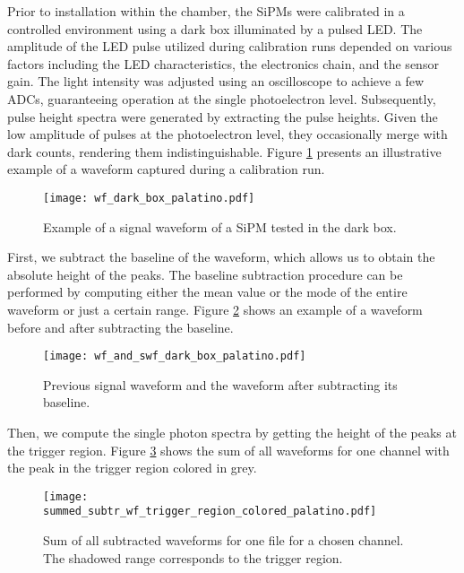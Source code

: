 \documentclass[11pt,a4paper,english,oneside, pdf]{article}
\begin{document}
	Prior to installation within the chamber, the SiPMs were calibrated in a controlled environment using a dark box illuminated by a pulsed LED. The amplitude of the LED pulse utilized during calibration runs depended on various factors including the LED characteristics, the electronics chain, and the sensor gain. The light intensity was adjusted using an oscilloscope to achieve a few ADCs, guaranteeing operation at the single photoelectron level. Subsequently, pulse height spectra were generated by extracting the pulse heights. Given the low amplitude of pulses at the photoelectron level, they occasionally merge with dark counts, rendering them indistinguishable. Figure \ref{fig:wf_dark_box} presents an illustrative example of a waveform captured during a calibration run.
	
	\begin{figure}[!h]
		\begin{center}
			\texttt{[image: wf\_dark\_box\_palatino.pdf]}
			\caption{Example of a signal waveform of a SiPM tested in the dark box.}
			\label{fig:wf_dark_box}
		\end{center}
	\end{figure}

	
	First, we subtract the baseline of the waveform, which allows us to obtain the absolute height of the peaks. The baseline subtraction procedure can be performed by computing either the mean value or the mode of the entire waveform or just a certain range. Figure \ref{fig:wf_and_swf_dark_box_palatino} shows an example of a waveform before and after subtracting the baseline.
	
	\begin{figure}[!h]
		\begin{center}
			\texttt{[image: wf\_and\_swf\_dark\_box\_palatino.pdf]}
			\caption{Previous signal waveform and the waveform after subtracting its baseline.}
			\label{fig:wf_and_swf_dark_box_palatino}
		\end{center}
	\end{figure}
	
	Then, we compute the single photon spectra by getting the height of the peaks at the trigger region. Figure \ref{fig:summed_subtr_wf_trigger_region_col} shows the sum of all waveforms for one channel with the peak in the trigger region colored in grey.
	
	\begin{figure}[!h]
		\begin{center}
			\texttt{[image: summed\_subtr\_wf\_trigger\_region\_colored\_palatino.pdf]}
			\caption{Sum of all subtracted waveforms for one file for a chosen channel. The shadowed range corresponds to the trigger region.}
			\label{fig:summed_subtr_wf_trigger_region_col}
		\end{center}
	\end{figure}
	
\end{document}
